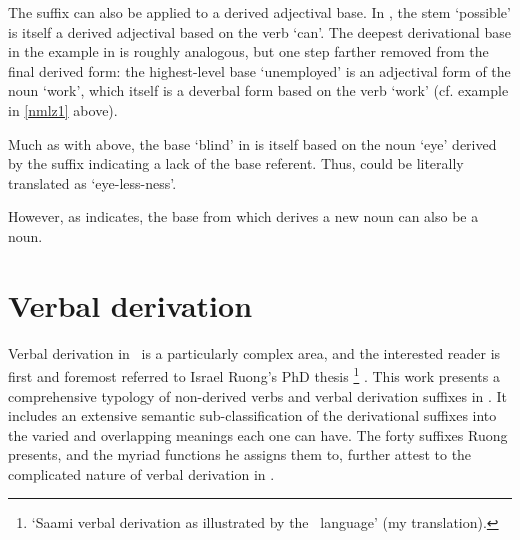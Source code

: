 The suffix  can also be applied to a derived adjectival base. In , the stem  ‘possible’ is itself a derived adjectival based on the verb  ‘can’. The deepest derivational base in the example in  is roughly analogous, but one step farther removed from the final derived form: the highest-level base  ‘unemployed’ is an adjectival form of the noun  ‘work’, which itself is a deverbal form based on the verb  ‘work’ (cf. example  in \SEC\ref{nmlz1} above). 
\ea\label{vuohtaEx5}
\z
\ea\label{vuohtaEx6}
\z

Much as with  above, the base  ‘blind’ in  is itself based on the noun  ‘eye’ derived by the suffix  indicating a lack of the base referent. Thus,  could be literally translated as ‘eye-less-ness’. 
\ea\label{vuohtaEx7}
\z

However, as  indicates, the base from which  derives a new noun can also be a noun. 
\ea\label{vuohtaEx4}
\z
{}


\section{Verbal derivation}\label{vDerivation}%
Verbal derivation in \PS\ is a particularly complex area, and the interested reader is first and foremost referred to Israel Ruong’s PhD thesis \footnote{‘Saami verbal derivation as illustrated by the \PS\ language’ (my translation).} 
\citep{Ruong1943}. This work presents a comprehensive typology of non-derived verbs and verbal derivation suffixes in \PS. %
It includes an extensive semantic sub-classification of the derivational suffixes into the varied and overlapping meanings each one can have. The forty suffixes Ruong presents, and the myriad functions he assigns them to, further attest to the complicated nature of verbal derivation in \PS. 

